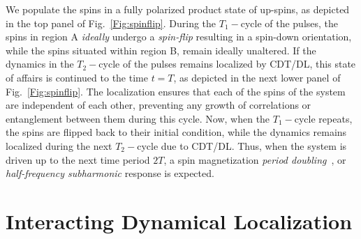 \documentclass[%
nofootinbib,
reprint,
superscriptaddress,
amsmath,amssymb,showkeys,
aps,
prb,
]{revtex4-2}
\begin{document}
	We populate the spins in a fully polarized product state of up-spins, as depicted in the top panel of Fig.~\ref{Fig:spinflip}. During the $T_1-$cycle of the pulses,  the spins in region A \textit{ideally} undergo a \textit{spin-flip} resulting in a spin-down orientation, while the spins situated within region B, remain ideally unaltered. If the dynamics in the $T_2-$cycle of the pulses remains localized by CDT/DL, this state of affairs is continued to the time $t=T$, as depicted in the next lower panel of Fig.~\ref{Fig:spinflip}. The localization ensures that each of the spins of the system are independent of each other, preventing any growth of correlations or entanglement between them during this cycle. Now, when the $T_1-$cycle repeats, the spins are flipped back to their initial condition, while the dynamics remains localized during the next $T_2-$cycle due to CDT/DL. Thus, when the system is driven up to the next time period $2T$, a spin magnetization \textit{period doubling}~\cite{rovny_31mathrmp_2018, Pan2020}, or \textit{half-frequency subharmonic} response is expected. 
	
	\section{\label{sec:level2} Interacting Dynamical Localization}
	
\end{document}
